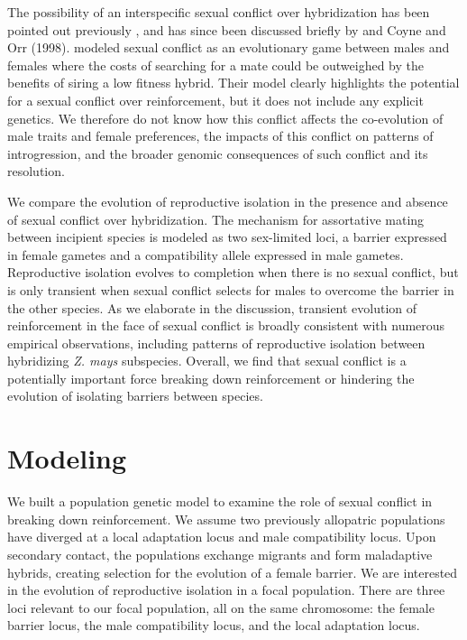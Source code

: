 \documentclass[11pt]{article}
\begin{document}
The possibility of an interspecific sexual conflict over hybridization has been pointed out previously \citet{Parker:1998bx}, and has since been discussed briefly by \citet{Gavrilets:2005gl} and Coyne and Orr (1998).  
\citet{Parker:1998bx} modeled sexual conflict as an evolutionary game between males and females where the costs of searching for a mate could be outweighed by the benefits of siring a low fitness hybrid. 
Their model clearly highlights the potential for a sexual conflict over reinforcement, but it does not include any explicit genetics.  We therefore do not know how this conflict affects the co-evolution of male traits and female preferences, the impacts of this conflict on patterns of introgression, and the broader genomic consequences of such conflict and its resolution. 

We compare the evolution of reproductive isolation in the presence and absence of sexual conflict over hybridization. 
The mechanism for assortative mating between incipient species is modeled as two sex-limited loci, a barrier expressed in female gametes and a compatibility allele expressed in male gametes.  
Reproductive isolation evolves to completion when there is no sexual conflict, but is only transient  when sexual conflict selects for males to overcome the barrier in the other species.  
As we elaborate in the discussion, transient evolution of reinforcement in the face of sexual conflict is broadly consistent with numerous empirical observations, including patterns of reproductive isolation between hybridizing \textit{Z. mays} subspecies.  
Overall, we find that sexual conflict is a potentially important force breaking down reinforcement or hindering the evolution of isolating barriers between species. 


\section*{Modeling}

We built a population genetic model to examine the role of sexual conflict in breaking down reinforcement. We assume two previously allopatric populations have diverged at a local adaptation locus and male compatibility locus. Upon secondary contact, the populations exchange migrants and form maladaptive hybrids, creating selection for the evolution of a female barrier. We are interested in the evolution of reproductive isolation in a focal population. There are three loci relevant to our focal population, all on the same chromosome: the female barrier locus, the male compatibility locus, and the local adaptation locus. 
\end{document}

